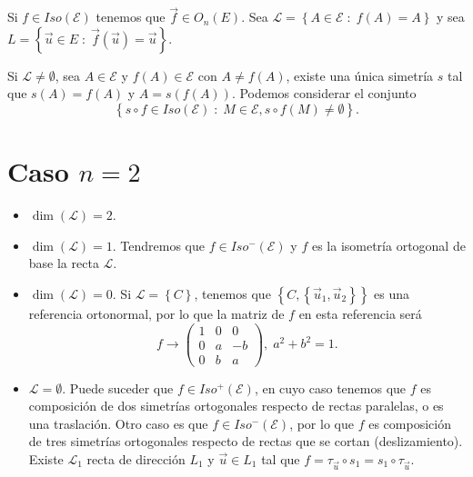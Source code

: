 Si $\displaystyle f \in Iso\left(\mathcal{E}\right) $ tenemos que $\displaystyle \vec{f} \in O_{n}\left(E\right) $. Sea $\displaystyle \mathcal{L} = \left\{ A \in \mathcal{E} \; : \; f\left(A\right) = A\right\}  $ y sea $\displaystyle L = \left\{ \vec{u} \in E \; : \; \vec{f}\left(\vec{u}\right) = \vec{u}\right\}  $. 
\begin{observation}
\normalfont Si $\displaystyle \mathcal{L} \neq \emptyset $, sea $\displaystyle A \in \mathcal{E} $ y $\displaystyle f\left(A\right) \in \mathcal{E} $ con $\displaystyle A \neq f\left(A\right) $, existe una única simetría $\displaystyle s $ tal que $\displaystyle s\left(A\right) = f\left(A\right) $ y $\displaystyle A = s\left(f\left(A\right)\right) $. Podemos considerar el conjunto 
\[ \left\{ s \circ f \in Iso\left(\mathcal{E}\right) \; : \; M \in \mathcal{E}, s\circ f\left(M\right) \neq \emptyset\right\}  .\]
\end{observation}
\section{Caso $\displaystyle n = 2 $}
\begin{itemize}
\item $\displaystyle \dim\left(\mathcal{L}\right) = 2 $.
\item $\displaystyle \dim\left(\mathcal{L}\right) = 1 $. Tendremos que $\displaystyle f \in Iso^{-}\left(\mathcal{E}\right) $ y $\displaystyle f $ es la isometría ortogonal de base la recta $\displaystyle \mathcal{L} $.
\item $\displaystyle \dim\left(\mathcal{L}\right) = 0 $. Si $\displaystyle \mathcal{L} = \left\{ C\right\}  $, tenemos que $\displaystyle \left\{ C, \left\{ \vec{u}_{1}, \vec{u}_{2}\right\} \right\}  $ es una referencia ortonormal, por lo que la matriz de $\displaystyle f $ en esta referencia será
	\[ f \to \begin{pmatrix} 1 & 0 & 0 \\
	0 & a & - b \\
0 & b & a\end{pmatrix}, \; a^{2} +b^{2} = 1 .\]
\item $\displaystyle \mathcal{L} = \emptyset $. Puede suceder que $\displaystyle f \in Iso^{+}\left(\mathcal{E}\right) $, en cuyo caso tenemos que $\displaystyle f $ es composición de dos simetrías ortogonales respecto de rectas paralelas, o es una traslación. Otro caso es que $\displaystyle f \in Iso^{-}\left(\mathcal{E}\right) $, por lo que $\displaystyle f $ es composición de tres simetrías ortogonales respecto de rectas que se cortan (deslizamiento). Existe $\displaystyle \mathcal{L}_{1} $ recta de dirección $\displaystyle L_{1} $ y $\displaystyle \vec{u} \in L_{1} $ tal que $\displaystyle f = \tau _{\vec{u}}\circ s_{1} = s_{1}\circ \tau_{\vec{u}} $.
\end{itemize}
